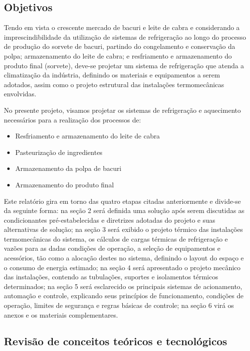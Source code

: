 \documentclass[10pt,a4paper]{article}
\begin{document}
\subsection{{ Objetivos}}
Tendo em vista o crescente mercado de bacuri e leite de cabra e considerando a imprescindibilidade da utilização de sistemas de refrigeração ao longo do processo de produção do sorvete de bacuri, partindo do congelamento e conservação da polpa; armazenamento do leite de cabra; e resfriamento e armazenamento do produto final (sorvete), deve-se projetar um sistema de refrigeração que atenda a climatização da indústria, definindo os materiais e equipamentos a serem adotados, assim como o projeto estrutural das instalações termomecânicas envolvidas.

No presente projeto, visamos projetar os sistemas de refrigeração e aquecimento necessários para a realização dos processos de:

\begin{itemize}
    \item Resfriamento e armazenamento do leite de cabra
    \item Pasteurização de ingredientes
    \item Armazenamento da polpa de bacuri
    \item Armazenamento do produto final
\end{itemize}

Este relatório gira em torno das quatro etapas citadas anteriormente e divide-se da seguinte forma: na seção 2 será definida uma solução após serem discutidas as condicionantes pré-estabelecidas e diretrizes adotadas do projeto e suas alternativas de solução; na seção 3 será exibido o projeto térmico das instalações termomecânicas do sistema, os cálculos de cargas térmicas de refrigeração e vazões para as dadas condições de operação, a seleção de equipamentos e acessórios, tão como a alocação destes no sistema, definindo o layout do espaço e o consumo de energia estimado; na seção 4 será apresentado o projeto mecânico das instalações, contendo as tubulações, suportes e isolamentos térmicos determinados; na seção 5 será esclarecido os principais sistemas de acionamento, automação e controle, explicando seus princípios de funcionamento, condições de operação, limites de segurança e regras básicas de controle; na seção 6 virá os anexos e os materiais complementares.


\subsection{{ Revisão de conceitos teóricos e tecnológicos}}
\end{document}
